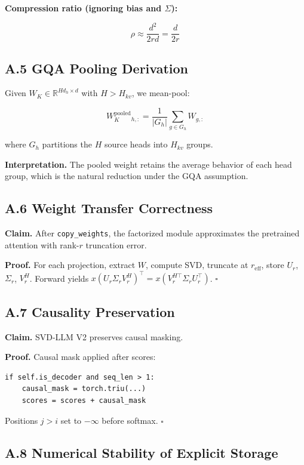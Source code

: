\textbf{Compression ratio (ignoring bias and $\Sigma$):}

\[
\rho \approx \frac{d^2}{2rd} = \frac{d}{2r}
\tag{A.3}
\]

\subsection{A.5 GQA Pooling Derivation}

Given $W_K \in \mathbb{R}^{H d_h \times d}$ with $H > H_{kv}$, we 
mean-pool:

\[
W_K^\text{pooled}_{h, :} = \frac{1}{|G_h|} \sum_{g \in G_h} W_{g, :}
\tag{A.4}
\]

where $G_h$ partitions the $H$ source heads into $H_{kv}$ groups.

\textbf{Interpretation.} The pooled weight retains the average behavior of each 
head group, which is the natural reduction under the GQA assumption.

\subsection{A.6 Weight Transfer Correctness}

\textbf{Claim.} After \texttt{copy\_weights}, the factorized module approximates the 
pretrained attention with rank-$r$ truncation error.

\textbf{Proof.} For each projection, extract $W$, compute SVD, truncate at 
$r_\text{eff}$, store $U_r$, $\Sigma_r$, $V_r^H$. Forward yields 
$x (U_r \Sigma_r V_r^H)^\top = x (V_r^{H\top} \Sigma_r U_r^\top)$. $\square$

\subsection{A.7 Causality Preservation}

\textbf{Claim.} SVD-LLM V2 preserves causal masking.

\textbf{Proof.} Causal mask applied after scores:

\begin{lstlisting}
if self.is_decoder and seq_len > 1:
    causal_mask = torch.triu(...)
    scores = scores + causal_mask
\end{lstlisting}

Positions $j > i$ set to $-\infty$ before softmax. $\square$

\subsection{A.8 Numerical Stability of Explicit Storage}

